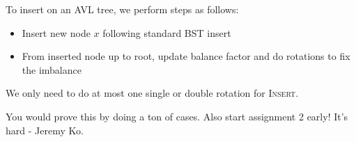 \noindent To insert on an AVL tree, we perform steps as follows:
\begin{itemize}
\item Insert new node $x$ following standard BST insert
\item From inserted node up to root, update balance factor and do rotations to fix the imbalance
\end{itemize}

\begin{claim}
We only need to do at most one  single or double rotation for \textsc{Insert}.
\end{claim}
You would prove this by doing a ton of cases. Also start assignment 2 early! It's hard - Jeremy Ko.
